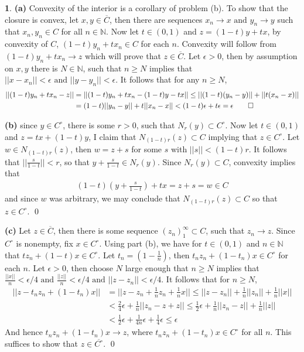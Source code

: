 \documentclass[10.5pt]{article}
\theoremstyle{definition}
\newtheorem{pb}{}
\newcommand{\norm}[1]{\lvert\lvert#1\rvert\rvert}
\newcommand{\tand}{\text{ and }}
\begin{document}
    \begin{pb}
        \textbf{(a)} Convexity of the interior is a corollary of problem (b). To show that the closure is convex, let \(x,y \in \overline{C}\), then there are sequences \(x_n \to x \tand y_n \to y\) such that \(x_n,y_n \in C\) for all \(n \in \mathbb{N}\). Now let \(t \in (0,1)\) and \(z = (1-t)y + tx\), by convexity of \(C\), \((1-t)y_n + tx_n \in C\) for each \(n\). Convexity will follow from \((1-t)y_n + tx_n \to z\) which will prove that \(z \in \overline{C}\). Let \(\epsilon > 0\), then by assumption on \(x,y\) there is \(N \in \mathbb{N}\), such that \(n \geq N\) implies that \(\norm{x - x_n} < \epsilon \tand \norm{y - y_n} < \epsilon\). It follows that for any \(n \geq N\),
        \begin{align*}
            \norm{(1-t)y_n + tx_n - z} &= \norm{(1-t)y_n + tx_n - (1-t)y - tx} \leq \norm{(1-t)(y_n-y)} + \norm{t(x_n - x)}\\ 
            &= (1-t)\norm{y_n - y} + t\norm{x_n - x} < (1-t)\epsilon + t \epsilon = \epsilon \qed
        \end{align*}

        \textbf{(b)} since \(y \in C^\circ\), there is some \(r > 0\), such that \(N_r(y) \subset C^\circ\). Now let \(t \in (0,1)\) and \(z = tx + (1-t)y\), I claim that \(N_{(1-t)r}(z) \subset C\) implying that \(z \in C^\circ\). Let \(w \in N_{(1-t)r}(z)\), then \(w = z + s\) for some \(s\) with \(\norm{s} < (1-t)r\). It follows that \(\norm{\frac{s}{1-t}} < r\), so that \(y + \frac{s}{1-t} \in N_r(y)\). Since \(N_r(y) \subset C\), convexity implies that
        \begin{align*}
            (1-t)(y + \frac{s}{1-t}) + tx = z + s = w \in C
        \end{align*}
        and since \(w\) was arbitrary, we may conclude that \(N_{(1-t)r}(z) \subset C\) so that \(z \in C^\circ\). \qed

        \textbf{(c)} Let \(z \in \overline{C}\), then there is some sequence \((z_n)_1^\infty \subset C\), such that \(z_n \to z\). Since \(C^\circ\) is nonempty, fix \(x \in C^\circ\). Using part (b), we have for \(t \in (0,1)\) and \(n \in \mathbb{N}\) that \(tz_n + (1-t)x \in C^\circ\). Let \(t_n = (1-\frac{1}{n})\), then \(t_nz_n + (1-t_n)x \in C^\circ\) for each \(n\). Let \(\epsilon > 0\), then choose \(N\) large enough that \(n \geq N\) implies that \(\frac{\norm{x}}{n} < \epsilon/4 \tand \frac{\norm{z}}{n} < \epsilon/4 \tand \norm{z - z_n} < \epsilon/4\). It follows that for \(n \geq N\),
        \begin{align*}
            \norm{z - t_nz_n + (1-t_n)x} &= \norm{z - z_n + \frac{1}{n}z_n + \frac{1}{n}x} \leq \norm{z - z_n} + \frac{1}{n}\norm{z_n} + \frac{1}{n}\norm{x} \\
            &< \frac{2}{4}\epsilon + \frac{1}{n}\norm{z_n - z + z} \leq \frac{1}{2}\epsilon + \frac{1}{n}\norm{z_n - z} + \frac{1}{n}\norm{z} \\
            &< \frac12 \epsilon + \frac{1}{4n}\epsilon + \frac14 \epsilon \leq \epsilon
        \end{align*}
        And hence \(t_nz_n + (1-t_n)x \to z\), where \(t_nz_n + (1-t_n)x \in C^\circ\) for all \(n\). This suffices to show that \(z \in \overline{C^\circ}\). \qed
    \end{pb}
\end{document}
